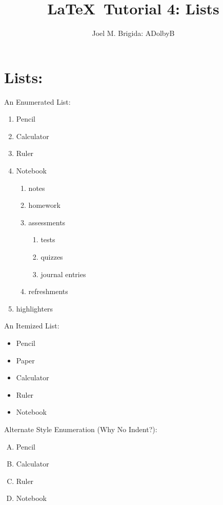 \documentclass[11pt]{article}
\title{\LaTeX\ Tutorial 4: Lists}
\author{Joel M. Brigida: ADolbyB}
\begin{document}
\maketitle %

\section{Lists:}
\thispagestyle{empty} %

An Enumerated List:
\begin{enumerate}
    \item Pencil
    \item Calculator
    \item Ruler
    \item Notebook
    \begin{enumerate}
        \item notes
        \item homework
        \item assessments
        \begin{enumerate}
            \item tests
            \item quizzes
            \item journal entries
        \end{enumerate}
        \item refreshments
    \end{enumerate}
\item highlighters
\end{enumerate}

\vspace{1cm}

An Itemized List:
\begin{itemize}
    \item Pencil
    \item Paper
    \item Calculator
    \item Ruler
    \item Notebook
\end{itemize}

\pagebreak

Alternate Style Enumeration (Why No Indent?):
\begin{enumerate}[A.] %
    \item Pencil
    \item Calculator
    \item Ruler
    \item Notebook
\end{enumerate}
\end{document}
